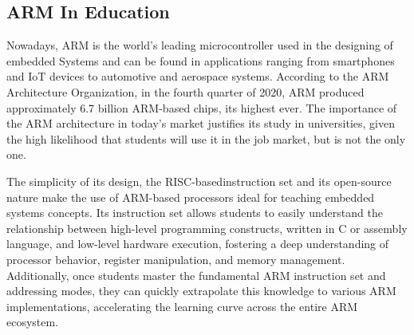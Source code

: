 \subsection{ARM In Education}
\label{chap:Back_ARM_Education}

Nowadays, ARM is the world's leading microcontroller used in the designing of 
embedded Systems and can be found in applications ranging from smartphones 
and IoT devices to automotive and aerospace systems. According to the ARM 
Architecture Organization, in the fourth quarter of 2020, ARM produced approximately 
6.7 billion ARM-based chips, its highest ever\cite{ArmRecord}. The importance of the ARM 
architecture in today's market justifies its study in universities, given the high likelihood 
that students will use it in the job market, but is not the only one.

The simplicity of its design, the RISC-basedinstruction set and its open-source 
nature make the use of ARM-based processors ideal for teaching embedded systems 
concepts. Its instruction set allows students to easily understand the relationship 
between high-level programming constructs, written in C or assembly 
language, and low-level hardware execution, fostering a deep understanding of 
processor behavior, register manipulation, and memory management. Additionally, 
once students master the fundamental ARM instruction set and addressing modes, 
they can quickly extrapolate this knowledge to various ARM implementations, 
accelerating the learning curve across the entire ARM ecosystem.